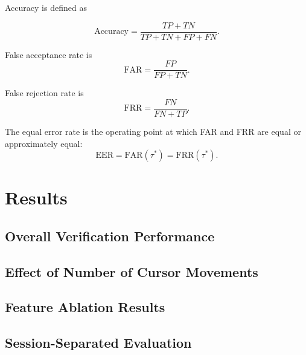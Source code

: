 \documentclass[conference]{IEEEtran}
\begin{document}
Accuracy is defined as 

\begin{equation}
\mathrm{Accuracy}
=
\frac{TP+TN}{TP+TN+FP+FN}.
\label{eq:accuracy}
\end{equation}

False acceptance rate is
\begin{equation}
\mathrm{FAR}
=
\frac{FP}{FP+TN}.
\label{eq:far}
\end{equation}

False rejection rate is
\begin{equation}
\mathrm{FRR}
=
\frac{FN}{FN+TP}.
\label{eq:frr}
\end{equation}

The equal error rate is the operating point at which FAR and FRR are equal
or approximately equal:
\begin{equation}
\mathrm{EER}
=
\mathrm{FAR}(\tau^{*})
=
\mathrm{FRR}(\tau^{*}).
\label{eq:eer}
\end{equation}

\section{Results}


\subsection{Overall Verification Performance}


\subsection{Effect of Number of Cursor Movements}


\subsection{Feature Ablation Results}


\subsection{Session-Separated Evaluation}
\end{document}
